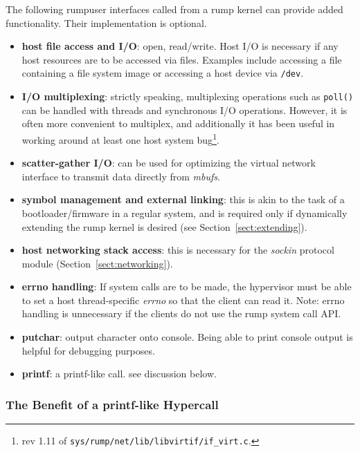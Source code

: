 The following rumpuser interfaces called from a rump kernel can
provide added functionality.  Their implementation is optional.

\begin{itemize}
\item   \textbf{host file access and I/O}: open, read/write.  Host I/O
	is necessary if any host resources are to be accessed via
	files.  Examples include accessing a file containing a file
	system image or accessing a host device via \texttt{/dev}.
\item   \textbf{I/O multiplexing}: strictly speaking, multiplexing
	operations such as \texttt{poll()} can be handled with
	threads and synchronous I/O operations.  However, it is
	often more convenient to multiplex, and additionally it
	has been useful in working around at least one host
	system bug\footnote{
		rev 1.11 of \texttt{sys/rump/net/lib/libvirtif/if\_virt.c}.
	}.
\item   \textbf{scatter-gather I/O}: can be used for optimizing
	the virtual network interface to transmit data directly
	from \textit{mbufs}\cite{stevens:tcpip2}.
\item   \textbf{symbol management and external linking}: this is
	akin to the task of a bootloader/firmware in a regular
	system, and is required only if dynamically extending the
	rump kernel is desired (see Section~\ref{sect:extending}).
\item   \textbf{host networking stack access}: this is necessary
	for the \textit{sockin} protocol module
	(Section~\ref{sect:networking}).
\item   \textbf{errno handling}: If system calls are to be made,
	the hypervisor must be able to set a host thread-specific
	\textit{errno} so that the client can read it.
	Note: errno handling is unnecessary if
	the clients do not use the rump system call API.
\item   \textbf{putchar}: output character onto console.  Being
	able to print console output is helpful for debugging purposes.
\item	\textbf{printf}: a printf-like call.  see discussion below.
\end{itemize}

\subsubsection*{The Benefit of a printf-like Hypercall}

